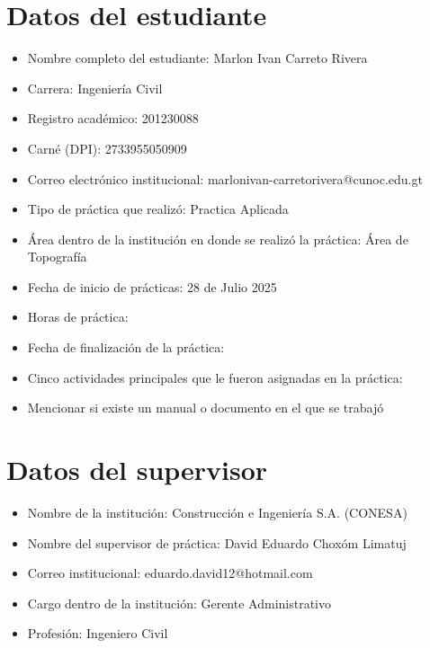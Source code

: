 \documentclass[12pt]{article}
\begin{document}
	\pagestyle{empty}
	
	
	\section*{Datos del estudiante}
	\begin{itemize}[label=$\blacksquare$]
		\item Nombre completo del estudiante:  Marlon Ivan Carreto Rivera
		\item Carrera: Ingeniería Civil
		\item Registro académico: 201230088
		\item Carné (DPI): 2733955050909 
		\item Correo electrónico institucional: marlonivan-carretorivera@cunoc.edu.gt
		\item Tipo de práctica que realizó: Practica Aplicada
		\item Área dentro de la institución en donde se realizó la práctica: Área de  Topografía 
		\item Fecha de inicio de prácticas: 28 de Julio 2025
		\item Horas de práctica: 
		\item Fecha de finalización de la práctica:
		\item Cinco actividades principales que le fueron asignadas en la práctica:
		\item Mencionar si existe un manual o documento en el que se trabajó
	\end{itemize}
	
	\section*{Datos del supervisor}
	\begin{itemize}[label=$\blacksquare$]
		\item Nombre de la institución: Construcción e Ingeniería S.A. (CONESA)
		\item Nombre del supervisor de práctica: David Eduardo Choxóm Limatuj
		\item Correo institucional: eduardo.david12@hotmail.com
		\item Cargo dentro de la institución: Gerente Administrativo 
		\item Profesión: Ingeniero Civil
	\end{itemize}
	
\end{document}
